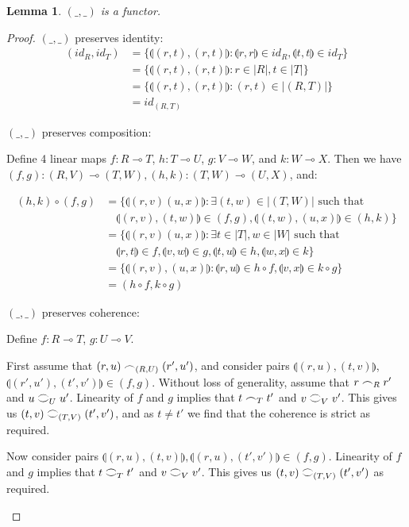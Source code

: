 \documentclass[12pt, oneside]{article}
\theoremstyle{plain}
\newtheorem{lemma}[theorem]{Lemma}
\theoremstyle{definition}
\newcommand{\lp}{\llparenthesis}
\newcommand{\rp}{\rrparenthesis}
\newcommand{\coh}[1][]{\mathrel{\vcenter{\offinterlineskip\hbox{$\frown$}\vskip0.2ex\hbox{$\smile$}}_{\ifx\\#1\\\else#1\fi}}}
\newcommand{\scoh}[1][]{\mathrel{\frown}_{\ifx\\#1\\\else#1\fi}}
\newcommand{\comp}{\mathbin{\circ}}
\begin{document}
\begin{lemma}\label{lem:CoparIsFunctor}
    $(\_,\_)$ is a functor.
\end{lemma}

\begin{proof}
    $(\_,\_)$ preserves identity:
    \begin{align*}
        (id_R,id_T) &= \{
            \lp(r,t),(r,t)\rp:\lp r,r\rp\in id_R,\lp t,t\rp\in id_T
        \} \\
        &= \{\lp(r,t),(r,t)\rp:r\in |R|,t\in |T|\} \\
        &= \{\lp(r,t),(r,t)\rp:(r,t)\in|(R,T)|\} \\
        &= id_{(R,T)}
    \end{align*}

    $(\_,\_)$ preserves composition:
    
    \begin{adjustwidth}{1.5em}{}
        Define 4 linear maps
        $f : R\multimap T$,
        $h : T\multimap U$,
        $g : V\multimap W$,
    and $k : W\multimap X$.
    Then we have $(f,g):(R,V)\multimap(T,W),(h,k):(T,W)\multimap(U,X)$, and:
    \end{adjustwidth}

    \begin{align*}
        (h,k)\comp(f,g) &= \{
            \lp(r,v)(u,x)\rp:\exists(t,w)\in|(T,W)| \text{ such that}\\
            &\quad\lp(r,v),(t,w)\rp\in(f,g),\lp(t,w),(u,x)\rp\in(h,k)
        \} \\
        &= \{
            \lp(r,v)(u,x)\rp:\exists t\in|T|,w\in|W| \text{ such that} \\
            &\quad\lp r,t\rp\in f,\lp v,w\rp\in g,\lp t,u\rp\in h,\lp w,x\rp\in k
        \} \\
        &= \{
            \lp(r,v),(u,x)\rp:\lp r,u\rp\in h\comp f,\lp v,x\rp\in k\comp g
        \} \\
        &= (h\comp f,k\comp g)
    \end{align*}

    $(\_,\_)$ preserves coherence:

    \begin{adjustwidth}{1.5em}{}
        Define $f:R\multimap T$, $g:U\multimap V$.

        First assume that $(r,u)\scoh[(R,U)](r',u')$, and consider pairs $\lp(r,u),(t,v)\rp$, $\lp(r',u'),(t',v')\rp\in(f,g)$.
        Without loss of generality, assume that $r\scoh[R]r'$ and $u\coh[U]u'$.
        Linearity of $f$ and $g$ implies that $t\scoh[T]t'$ and $v\coh[V]v'$.
        This gives us $(t,v)\coh[(T,V)](t',v')$, and as $t\neq t'$ we find that the coherence is strict as required.

        Now consider pairs $\lp(r,u),(t,v)\rp,\lp(r,u),(t',v')\rp\in(f,g)$.
        Linearity of $f$ and $g$ implies that $t\coh[T]t'$ and $v\coh[V]v'$.
        This gives us $(t,v)\coh[(T,V)](t',v')$ as required.

    \end{adjustwidth}

\end{proof}
\end{document}
